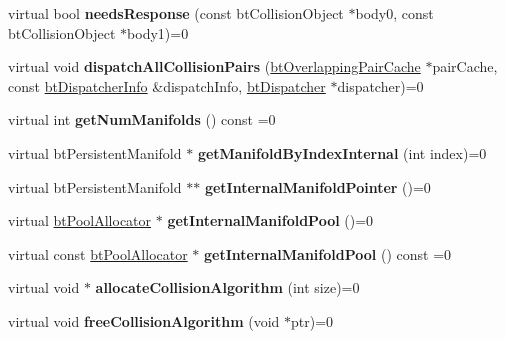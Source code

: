 \begin{DoxyCompactItemize}
\item 
\hypertarget{classbt_dispatcher_aa3ac9c7d70da34e5647da1018880624d}{virtual bool {\bfseries needs\+Response} (const bt\+Collision\+Object $\ast$body0, const bt\+Collision\+Object $\ast$body1)=0}\label{classbt_dispatcher_aa3ac9c7d70da34e5647da1018880624d}

\item 
\hypertarget{classbt_dispatcher_a2cc3450c2715feb9e36a34a98adaa005}{virtual void {\bfseries dispatch\+All\+Collision\+Pairs} (\hyperlink{classbt_overlapping_pair_cache}{bt\+Overlapping\+Pair\+Cache} $\ast$pair\+Cache, const \hyperlink{structbt_dispatcher_info}{bt\+Dispatcher\+Info} \&dispatch\+Info, \hyperlink{classbt_dispatcher}{bt\+Dispatcher} $\ast$dispatcher)=0}\label{classbt_dispatcher_a2cc3450c2715feb9e36a34a98adaa005}

\item 
\hypertarget{classbt_dispatcher_a0c94a046ac053c226d43211c5379c31f}{virtual int {\bfseries get\+Num\+Manifolds} () const =0}\label{classbt_dispatcher_a0c94a046ac053c226d43211c5379c31f}

\item 
\hypertarget{classbt_dispatcher_a39b0732750f15f48d2e8faa2de18d4e0}{virtual bt\+Persistent\+Manifold $\ast$ {\bfseries get\+Manifold\+By\+Index\+Internal} (int index)=0}\label{classbt_dispatcher_a39b0732750f15f48d2e8faa2de18d4e0}

\item 
\hypertarget{classbt_dispatcher_a6dc66e497da821c3646e1f89f7d53412}{virtual bt\+Persistent\+Manifold $\ast$$\ast$ {\bfseries get\+Internal\+Manifold\+Pointer} ()=0}\label{classbt_dispatcher_a6dc66e497da821c3646e1f89f7d53412}

\item 
\hypertarget{classbt_dispatcher_aa2f5918d1905cd291a10ced30b182c9c}{virtual \hyperlink{classbt_pool_allocator}{bt\+Pool\+Allocator} $\ast$ {\bfseries get\+Internal\+Manifold\+Pool} ()=0}\label{classbt_dispatcher_aa2f5918d1905cd291a10ced30b182c9c}

\item 
\hypertarget{classbt_dispatcher_a19470efec674c942b691c156dc89df40}{virtual const \hyperlink{classbt_pool_allocator}{bt\+Pool\+Allocator} $\ast$ {\bfseries get\+Internal\+Manifold\+Pool} () const =0}\label{classbt_dispatcher_a19470efec674c942b691c156dc89df40}

\item 
\hypertarget{classbt_dispatcher_a0f0b69ca4c16a66abdabf3575b655e78}{virtual void $\ast$ {\bfseries allocate\+Collision\+Algorithm} (int size)=0}\label{classbt_dispatcher_a0f0b69ca4c16a66abdabf3575b655e78}

\item 
\hypertarget{classbt_dispatcher_a70380f4805e189f34a56fcbf3eab5aaf}{virtual void {\bfseries free\+Collision\+Algorithm} (void $\ast$ptr)=0}\label{classbt_dispatcher_a70380f4805e189f34a56fcbf3eab5aaf}

\end{DoxyCompactItemize}


